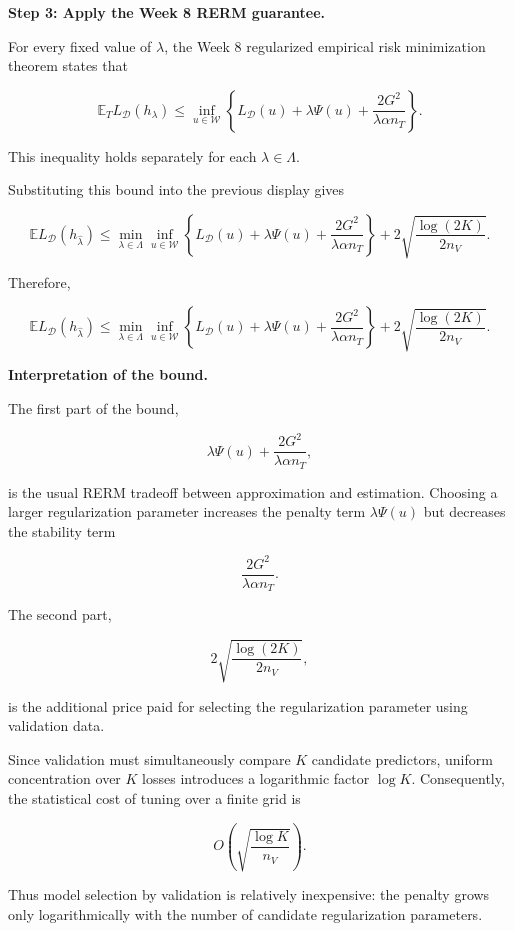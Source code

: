 \documentclass[11pt]{article}
\begin{document}
\begin{enumerate}
\begin{solutionbox}
\medskip

\textbf{Step 3: Apply the Week 8 RERM guarantee.}

For every fixed value of $\lambda$, the Week 8 regularized empirical risk minimization theorem states that

\[
\mathbb E_T
L_{\mathcal D}(h_\lambda)
\le
\inf_{u\in\mathcal W}
\left\{
L_{\mathcal D}(u)
+
\lambda\Psi(u)
+
\frac{2G^2}
{\lambda\alpha n_T}
\right\}.
\]

This inequality holds separately for each $\lambda\in\Lambda$.

Substituting this bound into the previous display gives

\[
\mathbb E
L_{\mathcal D}(h_{\widehat{\lambda}})
\le
\min_{\lambda\in\Lambda}
\inf_{u\in\mathcal W}
\left\{
L_{\mathcal D}(u)
+
\lambda\Psi(u)
+
\frac{2G^2}
{\lambda\alpha n_T}
\right\}
+
2\sqrt{
\frac{\log(2K)}
{2n_V}
}.
\]

Therefore,

\[
\boxed{
\mathbb E
L_{\mathcal D}(h_{\widehat{\lambda}})
\le
\min_{\lambda\in\Lambda}
\inf_{u\in\mathcal W}
\left\{
L_{\mathcal D}(u)
+
\lambda\Psi(u)
+
\frac{2G^2}
{\lambda\alpha n_T}
\right\}
+
2\sqrt{
\frac{\log(2K)}
{2n_V}
}
}.
\]

\medskip

\textbf{Interpretation of the bound.}

The first part of the bound,

\[
\lambda\Psi(u)
+
\frac{2G^2}
{\lambda\alpha n_T},
\]

is the usual RERM tradeoff between approximation and estimation. Choosing a larger regularization parameter increases the penalty term $\lambda\Psi(u)$ but decreases the stability term

\[
\frac{2G^2}{\lambda\alpha n_T}.
\]

The second part,

\[
2\sqrt{
\frac{\log(2K)}
{2n_V}
},
\]

is the additional price paid for selecting the regularization parameter using validation data.

Since validation must simultaneously compare $K$ candidate predictors, uniform concentration over $K$ losses introduces a logarithmic factor $\log K$. Consequently, the statistical cost of tuning over a finite grid is

\[
\boxed{
O\!\left(
\sqrt{\frac{\log K}{n_V}}
\right).
}
\]

Thus model selection by validation is relatively inexpensive: the penalty grows only logarithmically with the number of candidate regularization parameters.


\end{solutionbox}
\end{enumerate}
\end{document}
